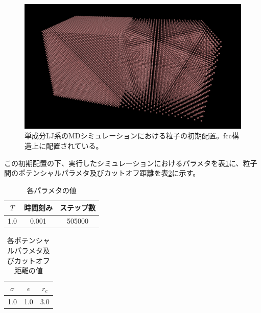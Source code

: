 \documentclass[titlepage]{jsreport}
\begin{document}
\begin{figure}[htbp]
    \begin{center}
        \includegraphics[width=14cm]{fig/ln78732-rn10976-ld0.629856-rd0.087808/ln78732-rn10976-ld0.629856-rd0.087808-first.png}
    \end{center}
    \caption{単成分LJ系のMDシミュレーションにおける粒子の初期配置。fcc構造上に配置されている。}
    \label{fig:ln78732-rn10976-ld0.629856-rd0.087808-first}
\end{figure}

\newpage
この初期配置の下、実行したシミュレーションにおけるパラメタを表\ref{table:mono-component-parameter}に、粒子間のポテンシャルパラメタ及びカットオフ距離を表\ref{table:mono-component-potential-parameter}に示す。

\begin{table}[htbp]
    \begin{center}
        \caption{各パラメタの値}
        \label{table:mono-component-parameter}
            \begin{tabular}{c c c}
                $T$ & 時間刻み & ステップ数 \\
                \hline
                1.0 & 0.001 & 505000 \\
            \end{tabular}
    \end{center}
\end{table}

\begin{table}[htbp]
    \begin{center}
        \caption{各ポテンシャルパラメタ及びカットオフ距離の値}
        \label{table:mono-component-potential-parameter}
            \begin{tabular}{c c c}
                $\sigma$ & $\epsilon$ & $r_c$ \\
                \hline
                1.0 & 1.0 & 3.0\\
            \end{tabular}
    \end{center}
\end{table}
\end{document}
